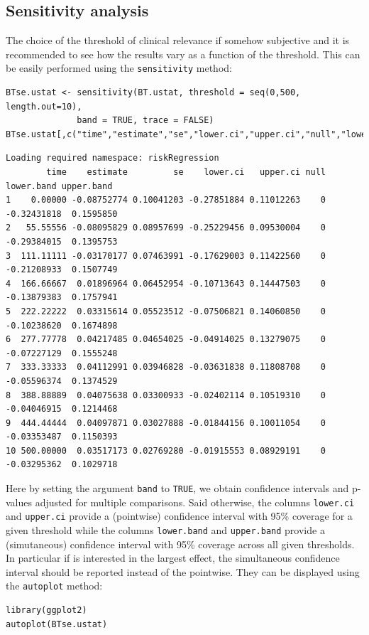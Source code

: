 \documentclass[12pt]{article}
\begin{document}
\clearpage

\subsection{Sensitivity analysis}
\label{sec:orgaf86ee5}

The choice of the threshold of clinical relevance if somehow
subjective and it is recommended to see how the results vary as a
function of the threshold. This can be easily performed using the
\texttt{sensitivity} method:
\lstset{language=r,label= ,caption= ,captionpos=b,numbers=none}
\begin{lstlisting}
BTse.ustat <- sensitivity(BT.ustat, threshold = seq(0,500, length.out=10),
			  band = TRUE, trace = FALSE)
BTse.ustat[,c("time","estimate","se","lower.ci","upper.ci","null","lower.band","upper.band")]
\end{lstlisting}

\begin{verbatim}
Loading required namespace: riskRegression
        time    estimate         se    lower.ci   upper.ci null  lower.band upper.band
1    0.00000 -0.08752774 0.10041203 -0.27851884 0.11012263    0 -0.32431818  0.1595850
2   55.55556 -0.08095829 0.08957699 -0.25229456 0.09530004    0 -0.29384015  0.1395753
3  111.11111 -0.03170177 0.07463991 -0.17629003 0.11422560    0 -0.21208933  0.1507749
4  166.66667  0.01896964 0.06452954 -0.10713643 0.14447503    0 -0.13879383  0.1757941
5  222.22222  0.03315614 0.05523512 -0.07506821 0.14060850    0 -0.10238620  0.1674898
6  277.77778  0.04217485 0.04654025 -0.04914025 0.13279075    0 -0.07227129  0.1555248
7  333.33333  0.04112991 0.03946828 -0.03631838 0.11808708    0 -0.05596374  0.1374529
8  388.88889  0.04075638 0.03300933 -0.02402114 0.10519310    0 -0.04046915  0.1214468
9  444.44444  0.04097871 0.03027888 -0.01844156 0.10011054    0 -0.03353487  0.1150393
10 500.00000  0.03517173 0.02769280 -0.01915553 0.08929191    0 -0.03295362  0.1029718
\end{verbatim}

Here by setting the argument \texttt{band} to \texttt{TRUE}, we obtain confidence
intervals and p-values adjusted for multiple comparisons. Said
otherwise, the columns \texttt{lower.ci} and \texttt{upper.ci} provide a (pointwise)
confidence interval with 95\% coverage for a given threshold while the
columns \texttt{lower.band} and \texttt{upper.band} provide a (simutaneous)
confidence interval with 95\% coverage across all given thresholds. In
particular if is interested in the largest effect, the simultaneous
confidence interval should be reported instead of the pointwise. They
can be displayed using the \texttt{autoplot} method:
\lstset{language=r,label= ,caption= ,captionpos=b,numbers=none}
\begin{lstlisting}
library(ggplot2)
autoplot(BTse.ustat)
\end{lstlisting}
\end{document}
